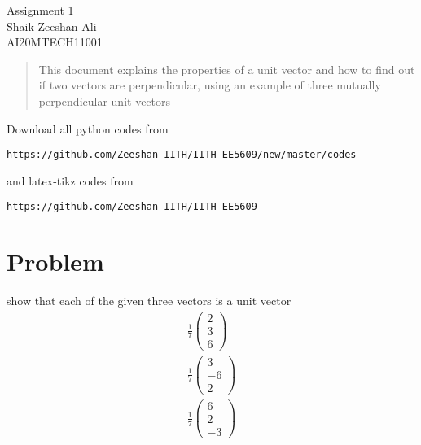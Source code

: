 \documentclass[journal,12pt,twocolumn]{IEEEtran}
\begin{document}
\begin{center}
\huge Assignment 1\\

\large Shaik Zeeshan Ali\\
\large AI20MTECH11001\\
\end{center}
\vspace{0.5cm}
\begin{abstract}
This document explains the properties of a unit vector and how to find out if two vectors are perpendicular, using an example of three mutually perpendicular unit vectors
\end{abstract}
\vspace{0.5cm}
Download all python codes from 
\begin{lstlisting}
https://github.com/Zeeshan-IITH/IITH-EE5609/new/master/codes
\end{lstlisting}
%
and latex-tikz codes from 
\begin{lstlisting}
https://github.com/Zeeshan-IITH/IITH-EE5609
\end{lstlisting}
%
\vspace{0.5cm}
\section{Problem}
show that each of the given three vectors is a unit vector
\begin{align}
     \frac{1}{7} \begin{pmatrix}2 \\3 \\6\end{pmatrix}\\
    \frac{1}{7}\begin{pmatrix}3 \\-6 \\2\end{pmatrix}\\
    \frac{1}{7}\begin{pmatrix}6 \\2 \\-3\end{pmatrix}
\end{align}
\end{document}
